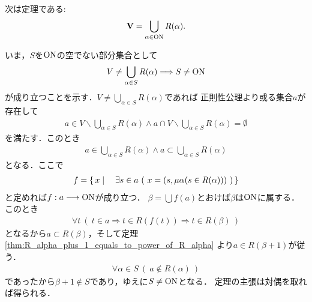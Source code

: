 	\begin{screen}
		\begin{thm}[すべての集合は整礎的である]\label{thm:every_set_is_well_founded}
			次は定理である:
			\begin{align}
				\mathbf{V} = \bigcup_{\alpha \in \mathrm{ON}} R(\alpha).
			\end{align}
		\end{thm}
	\end{screen}
	
	\begin{prf}
		いま，$S$を$\mathrm{ON}$の空でない部分集合として
		\begin{align}
			V \neq \bigcup_{\alpha \in S} R(\alpha)
			\Longrightarrow S \neq \mathrm{ON}
		\end{align}
		が成り立つことを示す．$V \neq \bigcup_{\alpha \in S} R(\alpha)$であれば
		正則性公理より或る集合$a$が存在して
		\begin{align}
			a \in V \backslash \bigcup_{\alpha \in S} R(\alpha)
			\wedge a \cap V \backslash \bigcup_{\alpha \in S} R(\alpha) = \emptyset
		\end{align}
		を満たす．このとき
		\begin{align}
			a \in \bigcup_{\alpha \in S} R(\alpha) \wedge a \subset \bigcup_{\alpha \in S} R(\alpha)
		\end{align}
		となる．ここで
		\begin{align}
			f = \left\{\, x \mid \quad \exists s \in a\ (\ x = (s,\mu \alpha (s \in R(\alpha)))\ )\, \right\}
		\end{align}
		と定めれば$f:a \longrightarrow \mathrm{ON}$が成り立つ．
		$\beta = \bigcup f(a)$とおけば$\beta$は$\mathrm{ON}$に属する．このとき
		\begin{align}
			\forall t\ (\ t \in a \Longrightarrow t \in R(f(t))
			\Longrightarrow t \in R(\beta)\ )
		\end{align}
		となるから$a \subset R(\beta)$，そして定理\ref{thm:R_alpha_plus_1_equals_to_power_of_R_alpha}
		より$a \in R(\beta + 1)$が従う．
		\begin{align}
			\forall \alpha \in S\ (\ a \notin R(\alpha)\ )
		\end{align}
		であったから$\beta + 1 \notin S$であり，ゆえに$S \neq \mathrm{ON}$となる．
		定理の主張は対偶を取れば得られる．
		\QED
	\end{prf}
	
	
